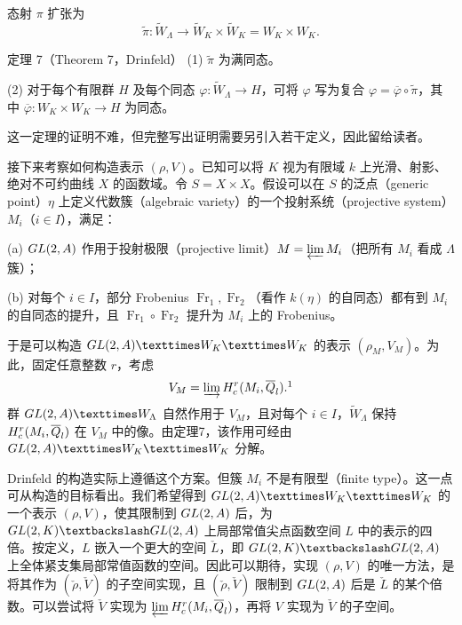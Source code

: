 态射 $\pi$ 扩张为
\[
 \widetilde\pi:\widetilde W_\Lambda\longrightarrow
 \widetilde W_K\times\widetilde W_K=W_K\times W_K.
\]
\begin{originaltheorem}{定理 7（Theorem 7，Drinfeld）}
(1) $\widetilde\pi$ 为满同态。

(2) 对于每个有限群 $H$ 及每个同态 $\varphi:\widetilde W_\Lambda\longrightarrow H$，可将 $\varphi$ 写为复合 $\varphi=\overline\varphi\circ\widetilde\pi$，其中 $\overline\varphi:W_K\times W_K\longrightarrow H$ 为同态。
\end{originaltheorem}

这一定理的证明不难，但完整写出证明需要另引入若干定义，因此留给读者。

接下来考察如何构造表示 $(\rho,V)$。已知可以将 $K$ 视为有限域 $k$ 上光滑、射影、绝对不可约曲线 $X$ 的函数域。令 $S=X\times X$。假设可以在 $S$ 的泛点（generic point）$\eta$ 上定义代数簇（algebraic variety）的一个投射系统（projective system）$M_i$（$i\in I$），满足：

(a) $GL(2,A)$ 作用于投射极限（projective limit）$M=\varprojlim M_i$（把所有 $M_i$ 看成 $\Lambda$ 簇）；

(b) 对每个 $i\in I$，部分 Frobenius $\operatorname{Fr}_1,\operatorname{Fr}_2$（看作 $k(\eta)$ 的自同态）都有到 $M_i$ 的自同态的提升，且 $\operatorname{Fr}_1\circ\operatorname{Fr}_2$ 提升为 $M_i$ 上的 Frobenius。

于是可以构造 $\GL(2,\A)\times W_K\times W_K$ 的表示 $(\rho_M,V_M)$。为此，固定任意整数 $r$，考虑
\[
 V_M=\varinjlim H_c^r(M_i,\overline\Q_l).\footnotemark
\]
群 $\GL(2,\A)\times\widetilde W_\Lambda$ 自然作用于 $V_M$，且对每个 $i\in I$，$\widetilde W_\Lambda$ 保持 $H_c^r(M_i,\overline{Q}_l)$ 在 $V_M$ 中的像。由定理7，该作用可经由 $\GL(2,\A)\times W_K\times W_K$ 分解。

Drinfeld 的构造实际上遵循这个方案。但簇 $M_i$ 不是有限型（finite type）。这一点可从构造的目标看出。我们希望得到 $\GL(2,\A)\times W_K\times W_K$ 的一个表示 $(\rho,V)$，使其限制到 $GL(2,A)$ 后，为 $\GL(2,K)\backslash\GL(2,\A)$ 上局部常值尖点函数空间 $L$ 中的表示的四倍。按定义，$L$ 嵌入一个更大的空间 $\check L$，即 $\GL(2,K)\backslash\GL(2,\A)$ 上全体紧支集局部常值函数的空间。因此可以期待，实现 $(\rho,V)$ 的唯一方法，是将其作为 $(\check\rho,\check V)$ 的子空间实现，且 $(\check\rho,\check V)$ 限制到 $GL(2,A)$ 后是 $\check L$ 的某个倍数。可以尝试将 $\check V$ 实现为 $\varprojlim H_c^r(M_i,\overline{Q}_l)$，再将 $V$ 实现为 $\check V$ 的子空间。

